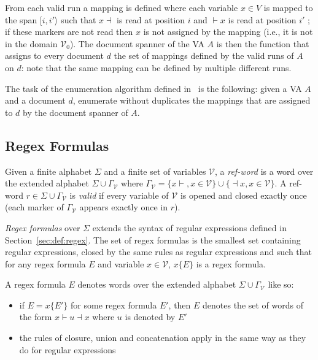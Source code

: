 \documentclass[12px]{article}
\newcommand{\Span}[1]{[#1\rangle}
\begin{document}
        From each valid run a mapping is defined where each variable $x \in V$
        is mapped to the span $\Span{i, i'}$ such that $x \dashv$ is read at
        position $i$ and $\vdash x$ is read at position $i'$ ; if these markers
        are not read then $x$ is not assigned by the mapping (i.e., it is not
        in the domain $\mathcal{V}_0$). The document spanner of the VA $A$ is
        then the function that assigns to every document $d$ the set of
        mappings defined by the valid runs of $A$ on $d$: note that the same
        mapping can be defined by multiple different runs.

        The task of the enumeration algorithm defined in~\cite{ICDT19} is the
        following: given a VA $A$ and a document $d$, enumerate without
        duplicates the mappings that are assigned to $d$ by the document
        spanner of $A$.

    \subsection{Regex Formulas}

      Given a finite alphabet $\Sigma$ and a finite set of variables
      $\mathcal{V}$, a \textit{ref-word} is a word over the extended alphabet
      $\Sigma \cup \Gamma_\mathcal{V}$ where $\Gamma_\mathcal{V} = \{x{\vdash},
      x \in \mathcal{V}\} \cup \{{\dashv}x, x \in \mathcal{V}\}$. A ref-word $r
      \in \Sigma \cup \Gamma_\mathcal{V}$ is \textit{valid} if every variable
      of $\mathcal{V}$ is opened and closed exactly once (each marker of
      $\Gamma_\mathcal{V}$ appears exactly once in $r$).


      \textit{Regex formulas} over $\Sigma$ extends the syntax of regular
      expressions defined in Section~\ref{sec:def:regex}. The set of regex
      formulas is the smallest set containing regular expressions, closed by
      the same rules as regular expressions and such that for any regex formula
      $E$ and variable $x \in \mathcal{V}$, $x\{E\}$ is a regex formula.

      A regex formula $E$ denotes words over the extended alphabet $\Sigma
      \cup \Gamma_\mathcal{V}$ like so:
        \begin{itemize}
          \item if $E = x\{E'\}$ for some regex formula $E'$, then $E$ denotes
            the set of words of the form $x{\vdash} u {\dashv}x$ where $u$ is
            denoted by $E'$
          \item the rules of closure, union and concatenation apply in the same
            way as they do for regular expressions
        \end{itemize}
\end{document}
